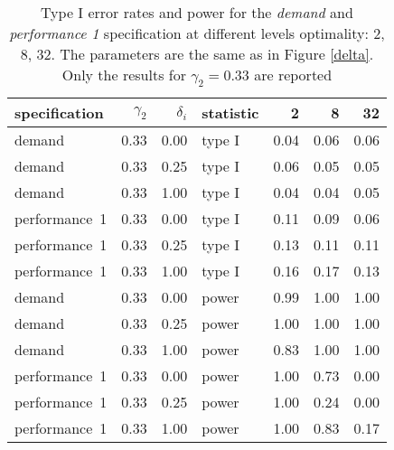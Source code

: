 \begin{table}[ht]
\centering
\begingroup\footnotesize
\begin{tabular}{lrrlrrr}
  \hline
specification & $\gamma_2$ & $\delta_i$ & statistic & 2 & 8 & 32 \\ 
  \hline
demand & 0.33 & 0.00 & type I & 0.04 & 0.06 & 0.06 \\ 
  demand & 0.33 & 0.25 & type I & 0.06 & 0.05 & 0.05 \\ 
  demand & 0.33 & 1.00 & type I & 0.04 & 0.04 & 0.05 \\ 
  performance~1 & 0.33 & 0.00 & type I & 0.11 & 0.09 & 0.06 \\ 
  performance~1 & 0.33 & 0.25 & type I & 0.13 & 0.11 & 0.11 \\ 
  performance~1 & 0.33 & 1.00 & type I & 0.16 & 0.17 & 0.13 \\ 
  demand & 0.33 & 0.00 & power & 0.99 & 1.00 & 1.00 \\ 
  demand & 0.33 & 0.25 & power & 1.00 & 1.00 & 1.00 \\ 
  demand & 0.33 & 1.00 & power & 0.83 & 1.00 & 1.00 \\ 
  performance~1 & 0.33 & 0.00 & power & 1.00 & 0.73 & 0.00 \\ 
  performance~1 & 0.33 & 0.25 & power & 1.00 & 0.24 & 0.00 \\ 
  performance~1 & 0.33 & 1.00 & power & 1.00 & 0.83 & 0.17 \\ 
   \hline
\end{tabular}
\endgroup
\caption{Type I error rates and power for the \emph{demand} and
             \emph{performance 1} specification at different levels optimality: 
             2, 8, 32. The parameters are the same as in Figure \ref{delta}.
             Only the results for $\gamma_{2} = 0.33$ are reported} 
\label{main-table}
\end{table}

